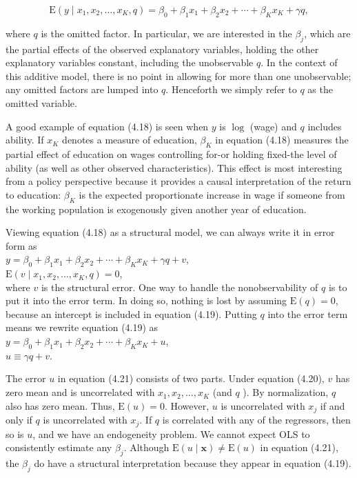 \documentclass[10pt]{article}
\begin{document}
\begin{equation*}
\mathrm{E}\left(y \mid x_{1}, x_{2}, \ldots, x_{K}, q\right)=\beta_{0}+\beta_{1} x_{1}+\beta_{2} x_{2}+\cdots+\beta_{K} x_{K}+\gamma q, \tag{4.18}
\end{equation*}


where $q$ is the omitted factor. In particular, we are interested in the $\beta_{j}$, which are the partial effects of the observed explanatory variables, holding the other explanatory variables constant, including the unobservable $q$. In the context of this additive model, there is no point in allowing for more than one unobservable; any omitted factors are lumped into $q$. Henceforth we simply refer to $q$ as the omitted variable.

A good example of equation (4.18) is seen when $y$ is $\log$ (wage) and $q$ includes ability. If $x_{K}$ denotes a measure of education, $\beta_{K}$ in equation (4.18) measures the partial effect of education on wages controlling for-or holding fixed-the level of ability (as well as other observed characteristics). This effect is most interesting from a policy perspective because it provides a causal interpretation of the return to education: $\beta_{K}$ is the expected proportionate increase in wage if someone from the working population is exogenously given another year of education.

Viewing equation (4.18) as a structural model, we can always write it in error form as\\
$y=\beta_{0}+\beta_{1} x_{1}+\beta_{2} x_{2}+\cdots+\beta_{K} x_{K}+\gamma q+v$,\\
$\mathrm{E}\left(v \mid x_{1}, x_{2}, \ldots, x_{K}, q\right)=0$,\\
where $v$ is the structural error. One way to handle the nonobservability of $q$ is to put it into the error term. In doing so, nothing is lost by assuming $\mathrm{E}(q)=0$, because an intercept is included in equation (4.19). Putting $q$ into the error term means we rewrite equation (4.19) as\\
$y=\beta_{0}+\beta_{1} x_{1}+\beta_{2} x_{2}+\cdots+\beta_{K} x_{K}+u$,\\
$u \equiv \gamma q+v$.

The error $u$ in equation (4.21) consists of two parts. Under equation (4.20), $v$ has zero mean and is uncorrelated with $x_{1}, x_{2}, \ldots, x_{K}$ (and $q$ ). By normalization, $q$ also has zero mean. Thus, $\mathrm{E}(u)=0$. However, $u$ is uncorrelated with $x_{j}$ if and only if $q$ is uncorrelated with $x_{j}$. If $q$ is correlated with any of the regressors, then so is $u$, and we have an endogeneity problem. We cannot expect OLS to consistently estimate any $\beta_{j}$. Although $\mathrm{E}(u \mid \mathbf{x}) \neq \mathrm{E}(u)$ in equation (4.21), the $\beta_{j}$ do have a structural interpretation because they appear in equation (4.19).
\end{document}
